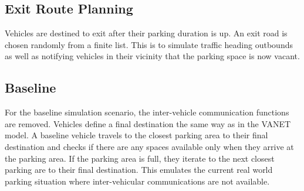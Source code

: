 \subsection{Exit Route Planning}
Vehicles are destined to exit after their parking duration is up. An exit road is chosen randomly from a finite list. This is to simulate traffic heading outbounds as well as notifying vehicles in their vicinity that the parking space is now vacant.

\subsection{Baseline}
For the baseline simulation scenario, the inter-vehicle communication functions are removed. Vehicles define a final destination the same way as in the \ac{VANET} model. A baseline vehicle travels to the closest parking area to their final destination and checks if there are any spaces available only when they arrive at the parking area. If the parking area is full, they iterate to the next closest parking are to their final destination. This emulates the current real world parking situation where inter-vehicular communications are not available.